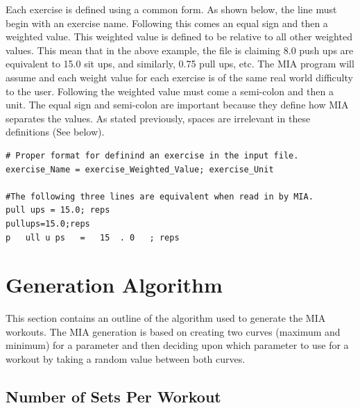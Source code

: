 Each exercise is defined using a common form. As shown below, the line must begin with an exercise name. Following this comes an equal sign and then a weighted value. This weighted value is defined to be relative to all other weighted values. This mean that in the above example, the file is claiming 8.0 push ups are equivalent to 15.0 sit ups, and similarly, 0.75 pull ups, etc. The MIA program will assume and each weight value for each exercise is of the same real world difficulty to the user. Following the weighted value must come a semi-colon and then a unit. The equal sign and semi-colon are important because they define how MIA separates the values. As stated previously, spaces are irrelevant in these definitions (See below).

\begin{lstlisting}
# Proper format for definind an exercise in the input file.
exercise_Name = exercise_Weighted_Value; exercise_Unit

#The following three lines are equivalent when read in by MIA.
pull ups = 15.0; reps
pullups=15.0;reps
p   ull u ps   =   15  . 0   ; reps
\end{lstlisting}


\section{Generation Algorithm}\label{workout algorithm}

This section contains an outline of the algorithm used to generate the MIA workouts. The MIA generation is based on creating two curves (maximum and minimum) for a parameter and then deciding upon which parameter to use for a workout by taking a random value between both curves.

\subsection{Number of Sets Per Workout}

